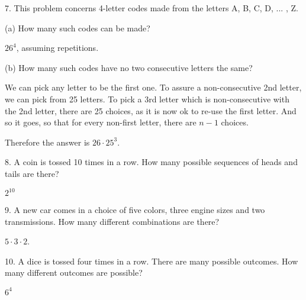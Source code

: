 \documentclass{hippoidC}
\begin{document}
\begin{prooflist}{ 7. This problem concerns 4-letter codes made from the letters
    A, B, C, D, ... , Z. }
\item (a) How many such codes can be made?
\item $26^4$, assuming repetitions.
\item (b) How many such codes have no two consecutive letters the same?
\item We can pick any letter to be the first one. To assure a non-consecutive
    2nd letter, we can pick from 25 letters.  To pick a 3rd letter which is
    non-consecutive with the 2nd letter, there are 25 choices, as it is now ok
    to re-use the first letter. And so it goes, so that for every non-first
    letter, there are $n-1$ choices.
\item Therefore the answer is $26\cdot 25^3$.
\end{prooflist}

\begin{prooflist}{8. A coin is tossed 10 times in a row. How many possible
    sequences of heads and tails are there? }
\item $2^{10}$
\end{prooflist}

\begin{prooflist} {9. A new car comes in a choice of five colors, three engine
    sizes and two transmissions. How many different combinations are there?}
\item $5 \cdot 3 \cdot 2$.
\end{prooflist}

\begin{prooflist}{ 10. A dice is tossed four times in a row. There are many
    possible outcomes. How many different outcomes are possible?}
\item $ 6^4$
\end{prooflist}
\end{document}
